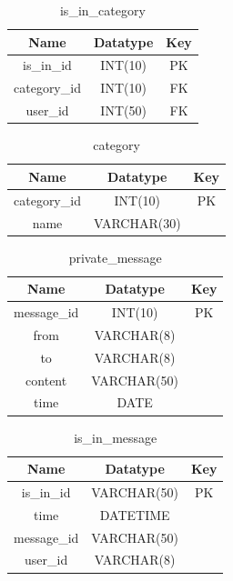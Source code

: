 \begin{table}[!ht]
\caption{is\_in\_category}
\centering
\begin{tabular}{c c c}
\hline\hline
Name               & Datatype    & Key \\
\hline
is\_in\_id         & INT(10)     & PK   \\
category\_id       & INT(10)     & FK   \\
user\_id           & INT(50)     & FK   \\
\hline
\end{tabular}
\label{table:nonlin}
\end{table}

\begin{table}[!ht]
\caption{category}
\centering
\begin{tabular}{c c c}
\hline\hline
Name               & Datatype    & Key \\
\hline
category\_id       & INT(10)     & PK  \\
name               & VARCHAR(30) &     \\
\hline
\end{tabular}
\label{table:nonlin}
\end{table}


\begin{table}[!ht]
\caption{private\_message}
\centering
\begin{tabular}{c c c}
\hline\hline
Name               & Datatype    & Key \\
\hline
message\_id        & INT(10)     & PK  \\
from               & VARCHAR(8)  &     \\
to                 & VARCHAR(8)  &     \\
content            & VARCHAR(50) &     \\
time               & DATE        &     \\
\hline
\end{tabular}
\label{table:nonlin}
\end{table}

\begin{table}[!ht]
\caption{is\_in\_message}
\centering
\begin{tabular}{c c c}
\hline\hline
Name               & Datatype        & Key \\
\hline
is\_in\_id         & VARCHAR(50)     & PK  \\
time               & DATETIME        &     \\
message\_id        & VARCHAR(50)     &     \\
user\_id           & VARCHAR(8)      &     \\
\hline
\end{tabular}
\label{table:nonlin}
\end{table}

